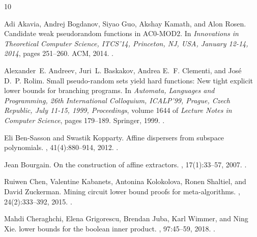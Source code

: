 \documentclass[10pt,a4paper]{article}
\theoremstyle{definition}
\theoremstyle{remark}
\begin{document}
\begin{thebibliography}{10}

Adi Akavia, Andrej Bogdanov, Siyao Guo, Akshay Kamath, and Alon Rosen.
\newblock Candidate weak pseudorandom functions in {AC0-MOD2}.
\newblock In {\em Innovations in Theoretical Computer Science, ITCS'14,
  Princeton, NJ, USA, January 12-14, 2014}, pages 251--260. {ACM}, 2014.
\newblock \href {https://doi.org/10.1145/2554797.2554821}
  {}.

Alexander~E. Andreev, Juri~L. Baskakov, Andrea E.~F. Clementi, and Jos{\'{e}}
  D.~P. Rolim.
\newblock Small pseudo-random sets yield hard functions: New tight explicit
  lower bounds for branching programs.
\newblock In {\em Automata, Languages and Programming, 26th International
  Colloquium, ICALP'99, Prague, Czech Republic, July 11-15, 1999, Proceedings},
  volume 1644 of {\em Lecture Notes in Computer Science}, pages 179--189.
  Springer, 1999.
\newblock \href {https://doi.org/10.1007/3-540-48523-6\_15}
  {}.

Eli Ben{-}Sasson and Swastik Kopparty.
\newblock Affine dispersers from subspace polynomials.
, 41(4):880--914, 2012.
\newblock \href {https://doi.org/10.1137/110826254}
  {}.

Jean Bourgain.
\newblock On the construction of affine extractors.
, 17(1):33--57, 2007.
\newblock \href {https://doi.org/10.1007/s00039-007-0593-z}
  {}.

Ruiwen Chen, Valentine Kabanets, Antonina Kolokolova, Ronen Shaltiel, and David
  Zuckerman.
\newblock Mining circuit lower bound proofs for meta-algorithms.
, 24(2):333--392, 2015.
\newblock \href {https://doi.org/10.1007/s00037-015-0100-0}
  {}.

Mahdi Cheraghchi, Elena Grigorescu, Brendan Juba, Karl Wimmer, and Ning Xie.
 lower bounds for the boolean
  inner product.
, 97:45--59, 2018.
\newblock \href {https://doi.org/10.1016/j.jcss.2018.04.006}
  {}.


\end{thebibliography}
\end{document}
